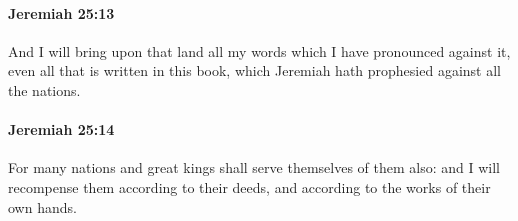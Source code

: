 		\paragraph{Jeremiah 25:13} %
			\label{JEREMIAH-25-13}

			And I will bring upon that land all my words which I have pronounced against it, even all that is written in this book, which Jeremiah hath prophesied against all the nations.


		\paragraph{Jeremiah 25:14} %
			\label{JEREMIAH-25-14}

			For many nations and great kings shall serve themselves of them also: and I will recompense them according to their deeds, and according to the works of their own hands.


